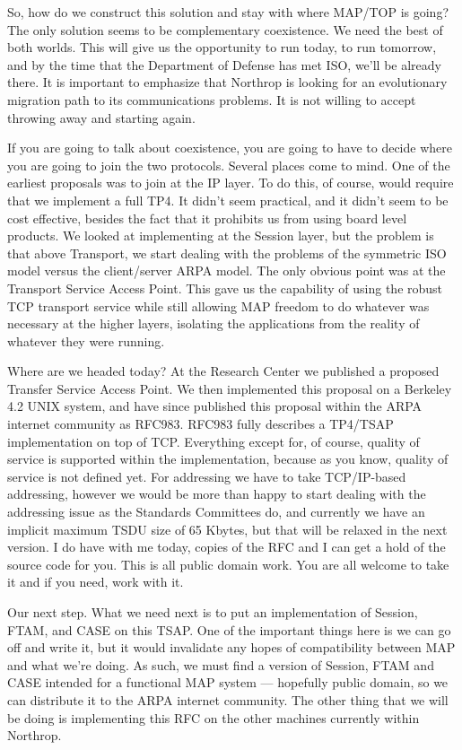 So, how do we construct this solution and stay with where MAP/TOP is going?
The only solution seems to be complementary coexistence.  We need the
best of both worlds.  This will give us the opportunity to run today,
to run tomorrow, and by the time that the Department of Defense has met
ISO, we'll be already there.  It is important to emphasize that Northrop
is looking for an evolutionary migration path to its communications problems.
It is not willing to accept throwing away and starting again.

If you are going to talk about coexistence, you are going to have to decide
where you are going to join the two protocols.  Several places come to
mind.  One of the earliest proposals was to join at the IP layer.  To do
this, of course, would require that we implement a full TP4.  It didn't
seem practical, and it didn't seem to be cost effective, besides the fact
that it prohibits us from using board level products.  We looked at
implementing at the Session layer, but the problem is that above Transport,
we start dealing with the problems of the symmetric ISO model versus the
client/server ARPA model.  The only obvious point was at the Transport
Service Access Point.  This gave us the capability of using the robust
TCP transport service while still allowing MAP freedom to do whatever
was necessary at the higher layers, isolating the applications from 
the reality of whatever they were running.

Where are we headed today?  At the Research Center we published a
proposed Transfer Service Access Point.  We then implemented this proposal
on a Berkeley 4.2 UNIX system, and have since published this proposal
within the ARPA internet community as RFC983.  RFC983 fully describes
a TP4/TSAP implementation on top of TCP.  Everything except for, of course,
quality of service is supported within the implementation, because as you
know, quality of service is not defined yet.  For addressing we have to take
TCP/IP-based addressing, however we would be more than happy to start dealing
with the addressing issue as the Standards Committees do, and currently
we have an implicit maximum TSDU size of 65 Kbytes, but that will be
relaxed in the next version.  I do have with me today, copies of the RFC
and I can get a hold of the source code for you.  This is all public
domain work.  You are all welcome to take it and if you need, work with it.

Our next step.  What we need next is to put an implementation of Session, FTAM,
and CASE on this TSAP.  One of the important things here is we can go
off and write it, but it would invalidate any hopes of compatibility between
MAP and what we're doing.  As such, we must find a version of Session, FTAM
and CASE intended for a functional MAP system --- hopefully public domain,
so we can distribute it to the ARPA internet community.  The other thing
that we will be doing is implementing this RFC on the other machines
currently within Northrop.

